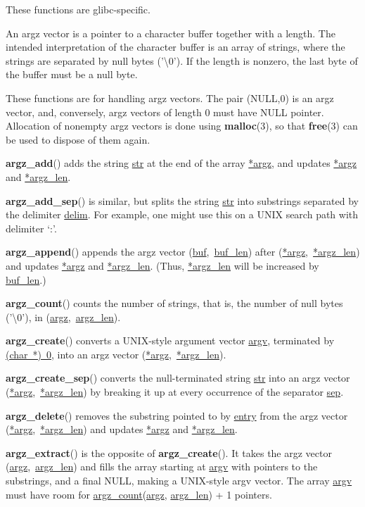 \documentclass[]{article}
\let\realtextbf=\textbf
\renewcommand{\textbf}[1]{\textcolor{boldcolor}{\realtextbf{#1}}}
\renewcommand{\emph}[1]{\underline{#1}}
\begin{document}
These functions are glibc-specific.

An argz vector is a pointer to a character buffer together with a
length. The intended interpretation of the character buffer is an array
of strings, where the strings are separated by null bytes
('\textbackslash{}0'). If the length is nonzero, the last byte of the
buffer must be a null byte.

These functions are for handling argz vectors. The pair (NULL,0) is an
argz vector, and, conversely, argz vectors of length 0 must have NULL
pointer. Allocation of nonempty argz vectors is done using
\textbf{malloc}(3), so that \textbf{free}(3) can be used to dispose of
them again.

\textbf{argz\_add}() adds the string \emph{str} at the end of the array
\emph{*argz}, and updates \emph{*argz} and \emph{*argz\_len}.

\textbf{argz\_add\_sep}() is similar, but splits the string \emph{str}
into substrings separated by the delimiter \emph{delim}. For example,
one might use this on a UNIX search path with delimiter `:'.

\textbf{argz\_append}() appends the argz vector
(\emph{buf},~\emph{buf\_len}) after (\emph{*argz},~\emph{*argz\_len})
and updates \emph{*argz} and \emph{*argz\_len}. (Thus, \emph{*argz\_len}
will be increased by \emph{buf\_len}.)

\textbf{argz\_count}() counts the number of strings, that is, the number
of null bytes ('\textbackslash{}0'), in (\emph{argz},~\emph{argz\_len}).

\textbf{argz\_create}() converts a UNIX-style argument vector
\emph{argv}, terminated by \emph{(char~*)~0}, into an argz vector
(\emph{*argz},~\emph{*argz\_len}).

\textbf{argz\_create\_sep}() converts the null-terminated string
\emph{str} into an argz vector (\emph{*argz},~\emph{*argz\_len}) by
breaking it up at every occurrence of the separator \emph{sep}.

\textbf{argz\_delete}() removes the substring pointed to by \emph{entry}
from the argz vector (\emph{*argz},~\emph{*argz\_len}) and updates
\emph{*argz} and \emph{*argz\_len}.

\textbf{argz\_extract}() is the opposite of \textbf{argz\_create}(). It
takes the argz vector (\emph{argz},~\emph{argz\_len}) and fills the
array starting at \emph{argv} with pointers to the substrings, and a
final NULL, making a UNIX-style argv vector. The array \emph{argv} must
have room for \emph{argz\_count}(\emph{argz}, \emph{argz\_len}) + 1
pointers.
\end{document}
